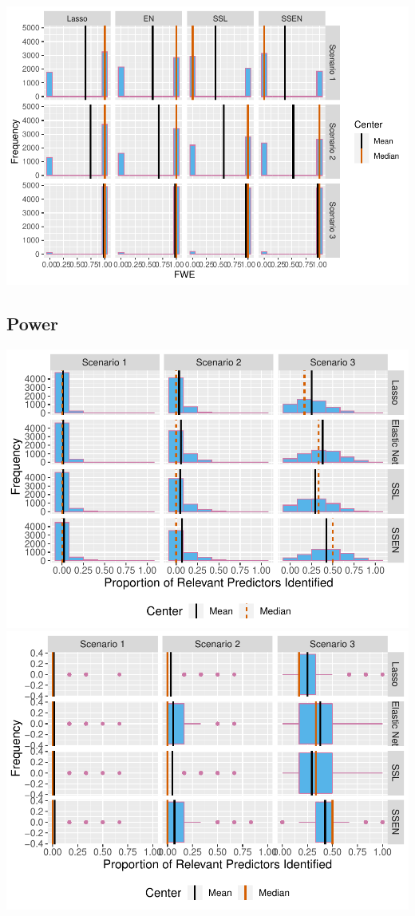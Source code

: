 \documentclass[
]{article}
\begin{document}
\includegraphics{simulation_results_files/figure-latex/unnamed-chunk-23-1.pdf}

\hypertarget{power}{%
\subsection{Power}\label{power}}

\includegraphics{simulation_results_files/figure-latex/unnamed-chunk-24-1.pdf}
\includegraphics{simulation_results_files/figure-latex/unnamed-chunk-24-2.pdf}
\end{document}
